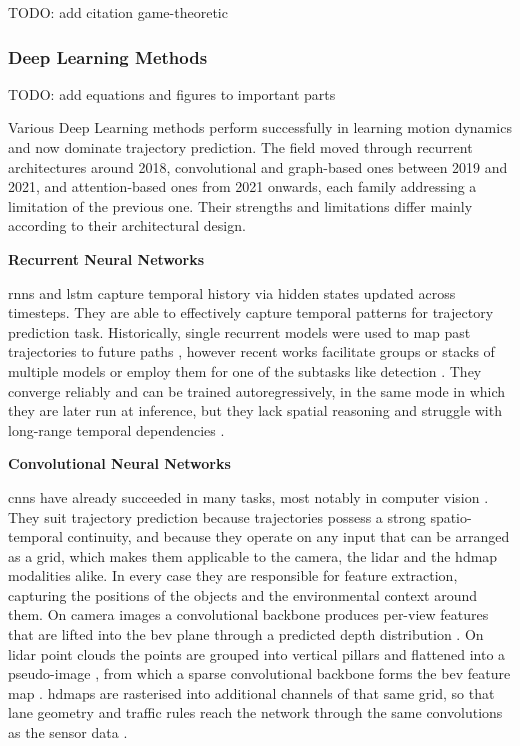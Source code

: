TODO: add citation game-theoretic

\subsubsection{Deep Learning Methods}
TODO: add equations and figures to important parts

\label{subsec:sota-dl}
Various Deep Learning methods perform successfully in learning motion dynamics and now dominate trajectory
prediction. The field moved through recurrent architectures around 2018, convolutional and graph-based
ones between 2019 and 2021, and attention-based ones from 2021 onwards, each family addressing a
limitation of the previous one. Their strengths and limitations differ mainly according to their
architectural design.

\textbf{Recurrent Neural Networks}

\Acp{rnn} and \ac{lstm} capture temporal history via hidden states updated across timesteps. They are able
to effectively capture temporal patterns for trajectory prediction task. Historically, single recurrent
models were used to map past trajectories to future paths \cite{Hoy2018Pedestrian}, however recent works
facilitate groups or stacks of multiple models \cite{Xin2018DualLSTM} or employ them for one of the subtasks
like detection \cite{Shao2023ReasonNet}. They converge reliably and can be trained autoregressively, in the
same mode in which they are later run at inference, but they lack spatial reasoning and struggle with
long-range temporal dependencies \cite{Liu2021DLSurvey}.

\textbf{Convolutional Neural Networks}

\Acp{cnn} have already succeeded in many tasks, most notably in computer vision
\cite{Krizhevsky2012AlexNet}. They suit trajectory prediction because trajectories possess a strong
spatio-temporal continuity, and because they operate on any input that can be arranged as a grid, which
makes them applicable to the camera, the \ac{lidar} and the \ac{hdmap} modalities alike. In every case they
are responsible for feature extraction, capturing the positions of the objects and the environmental
context around them. On camera images a convolutional backbone produces per-view features that are lifted
into the \ac{bev} plane through a predicted depth distribution \cite{Philion2020LSS}. On \ac{lidar} point
clouds the points are grouped into vertical pillars and flattened into a pseudo-image
\cite{Lang2019PointPillars}, from which a sparse convolutional backbone forms the \ac{bev} feature map
\cite{Yan2018SECOND}. \Acp{hdmap} are rasterised into additional channels of that same grid, so that lane
geometry and traffic rules reach the network through the same convolutions as the sensor data
\cite{CoverNet2020}.

